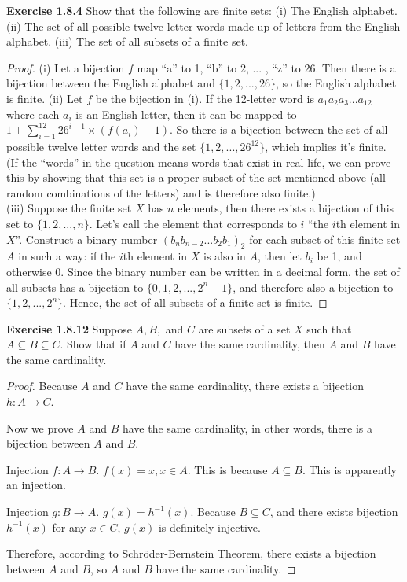 \documentclass[12pt]{article}
\theoremstyle{definition}
\numberwithin{equation}{subsection}
\begin{document}
\textbf{Exercise 1.8.4} Show that the following are finite sets: (i) The English alphabet.
(ii) The set of all possible twelve letter words made up of letters from the English alphabet.
(iii) The set of all subsets of a finite set.
\begin{proof}
(i) Let a bijection $f$ map ``a'' to 1, ``b'' to 2, ... , ``z'' to 26. Then there is a bijection between the English alphabet and $\{1,2,...,26\}$, so the English alphabet is finite.\newline
(ii) Let $f$ be the bijection in (i). If the 12-letter word is $a_{1}a_{2}a_{3}...a_{12}$ where each $a_{i}$ is an English letter, then it can be mapped to $1+\sum_{i=1}^{12} 26^{i-1}\times (f(a_{i})-1)$. So there is a bijection between the set of all possible twelve letter words and the set $\{1,2,...,26^{12}\}$, which implies it's finite.
\\(If the ``words'' in the question means words that exist in real life, we can prove this by showing that this set is a proper subset of the set mentioned above (all random combinations of the letters) and is therefore also finite.)\\
(iii) Suppose the finite set $X$ has $n$ elements, then there exists a bijection of this set to $\{1,2,...,n\}$. Let's call the element that corresponds to $i$ ``the $i$th element in $X$''. Construct a binary number ${(b_{n}b_{n-2}...b_2b_1)}_{2}$ for each subset of this finite set $A$ in such a way: if the $i$th element in $X$ is also in $A$, then let $b_i$ be 1, and otherwise 0. Since the binary number can be written in a decimal form, the set of all subsets has a bijection to $\{0,1,2,...,2^n-1\}$, and therefore also a bijection to $\{1,2,...,2^n\}$. Hence, the set of all subsets of a finite set is finite.
\end{proof}

\textbf{Exercise 1.8.12} Suppose \(A, B,\) and \(C\) are subsets of a set \(X\) such that
\(A \subseteq B \subseteq C .\) Show that if \(A\) and \(C\) have the same cardinality, then \(A\) and
\(B\) have the same cardinality.
\begin{proof}
Because $A$ and $C$ have the same cardinality, there exists a bijection $h: A \rightarrow C$.

Now we prove $A$ and $B$ have the same cardinality, in other words, there is a bijection between $A$ and $B$.

Injection $f:A\rightarrow B$. $f(x)=x, x\in A$. This is because $A \subseteq B$. This is apparently an injection.

Injection $g:B\rightarrow A$. $g(x)=h^{-1}(x)$. Because $B \subseteq C$, and there exists bijection $h^{-1}(x)$ for any $x \in C$, $g(x)$ is definitely injective.

Therefore, according to Schr\"oder-Bernstein Theorem, there exists a bijection between $A$ and $B$, so \(A\) and
\(B\) have the same cardinality.
\end{proof}
\end{document}
